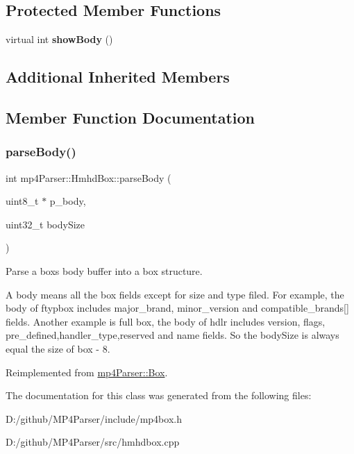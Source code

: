\subsection*{Protected Member Functions}
\begin{DoxyCompactItemize}
\item 
\mbox{\label{classmp4_parser_1_1_hmhd_box_a7d33663419b1f7e380490a9bf9d2ed2a}} 
virtual int {\bfseries show\+Body} ()
\end{DoxyCompactItemize}
\subsection*{Additional Inherited Members}


\subsection{Member Function Documentation}
\mbox{\label{classmp4_parser_1_1_hmhd_box_a78bdbbff24ea09eb8844323364879f78}} 
\subsubsection{\texorpdfstring{parseBody()}{parseBody()}}
{\footnotesize\ttfamily int mp4\+Parser\+::\+Hmhd\+Box\+::parse\+Body (\begin{DoxyParamCaption}\item[{uint8\+\_\+t $\ast$}]{p\+\_\+body,  }\item[{uint32\+\_\+t}]{body\+Size }\end{DoxyParamCaption})\hspace{0.3cm}{\ttfamily [virtual]}}



Parse a box\textquotesingle{}s body buffer into a box structure. 

A body means all the box fields except for size and type filed. For example, the body of ftypbox includes major\+\_\+brand, minor\+\_\+version and compatible\+\_\+brands\mbox{[}\mbox{]} fields. Another example is full box, the body of hdlr includes version, flags, pre\+\_\+defined,handler\+\_\+type,reserved and name fields. So the body\+Size is always equal the size of box -\/ 8. 

Reimplemented from \mbox{\hyperlink{classmp4_parser_1_1_box_a3dd0c084ac65bc77b69ac5ecaf796cb2}{mp4\+Parser\+::\+Box}}.



The documentation for this class was generated from the following files\+:\begin{DoxyCompactItemize}
\item 
D\+:/github/\+M\+P4\+Parser/include/mp4box.\+h\item 
D\+:/github/\+M\+P4\+Parser/src/hmhdbox.\+cpp\end{DoxyCompactItemize}
